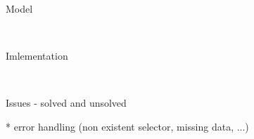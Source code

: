 \sec Model

~


\sec Imlementation

~


\sec Issues - solved and unsolved

\begitems
  * error handling (non existent selector, missing data, ...)
\enditems





